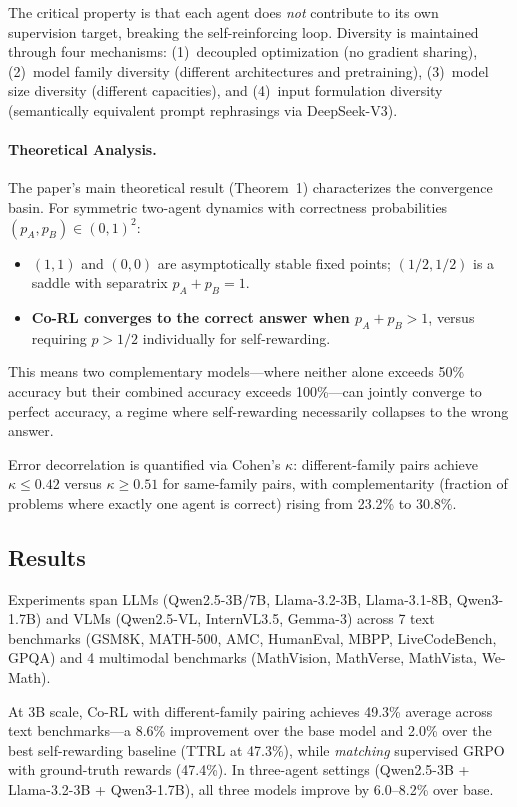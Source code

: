 \documentclass[11pt,a4paper]{article}
\begin{document}
The critical property is that each agent does \emph{not} contribute to its own supervision target, breaking the self-reinforcing loop. Diversity is maintained through four mechanisms: (1)~decoupled optimization (no gradient sharing), (2)~model family diversity (different architectures and pretraining), (3)~model size diversity (different capacities), and (4)~input formulation diversity (semantically equivalent prompt rephrasings via DeepSeek-V3).

\paragraph{Theoretical Analysis.} The paper's main theoretical result (Theorem~1) characterizes the convergence basin. For symmetric two-agent dynamics with correctness probabilities $(p_A, p_B) \in (0,1)^2$:
\begin{itemize}
\item $(1,1)$ and $(0,0)$ are asymptotically stable fixed points; $(1/2, 1/2)$ is a saddle with separatrix $p_A + p_B = 1$.
\item \textbf{Co-RL converges to the correct answer when $p_A + p_B > 1$}, versus requiring $p > 1/2$ individually for self-rewarding.
\end{itemize}
This means two complementary models---where neither alone exceeds 50\% accuracy but their combined accuracy exceeds 100\%---can jointly converge to perfect accuracy, a regime where self-rewarding necessarily collapses to the wrong answer.

Error decorrelation is quantified via Cohen's $\kappa$: different-family pairs achieve $\kappa \leq 0.42$ versus $\kappa \geq 0.51$ for same-family pairs, with complementarity (fraction of problems where exactly one agent is correct) rising from 23.2\% to 30.8\%.

\subsection{Results}
Experiments span LLMs (Qwen2.5-3B/7B, Llama-3.2-3B, Llama-3.1-8B, Qwen3-1.7B) and VLMs (Qwen2.5-VL, InternVL3.5, Gemma-3) across 7 text benchmarks (GSM8K, MATH-500, AMC, HumanEval, MBPP, LiveCodeBench, GPQA) and 4 multimodal benchmarks (MathVision, MathVerse, MathVista, We-Math).

At 3B scale, Co-RL with different-family pairing achieves 49.3\% average across text benchmarks---a 8.6\% improvement over the base model and 2.0\% over the best self-rewarding baseline (TTRL at 47.3\%), while \emph{matching} supervised GRPO with ground-truth rewards (47.4\%). In three-agent settings (Qwen2.5-3B + Llama-3.2-3B + Qwen3-1.7B), all three models improve by 6.0--8.2\% over base.
\end{document}
